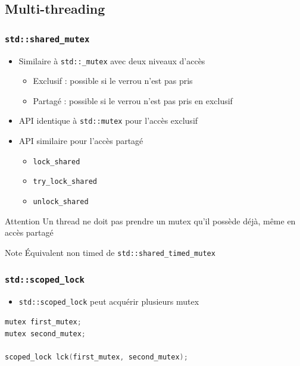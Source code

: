 \documentclass[C++.tex]{subfiles}
\begin{document}
\subsection*{Multi-threading}
\begin{frame}[fragile]
	\frametitle{\lstinline|std::shared_mutex|}
	\begin{itemize}
		\item Similaire à \lstinline|std::_mutex| avec deux niveaux d'accès
		\begin{itemize}
			\item Exclusif : possible si le verrou n'est pas pris
			\item Partagé : possible si le verrou n'est pas pris en exclusif
		\end{itemize}
		\item API identique à \lstinline|std::mutex| pour l'accès exclusif
		\item API similaire pour l'accès partagé
		\begin{itemize}
			\item \lstinline|lock_shared|
			\item \lstinline|try_lock_shared|
			\item \lstinline|unlock_shared|
		\end{itemize}
	\end{itemize}

	\begin{alertblock}{Attention}
		Un thread ne doit pas prendre un mutex qu'il possède déjà, même en accès partagé
	\end{alertblock}

	\begin{block}{Note}
		Équivalent non \og timed\fg{} de \lstinline|std::shared_timed_mutex|
	\end{block}
\end{frame}

\begin{frame}[fragile]
	\frametitle{\lstinline|std::scoped_lock|}
	\begin{itemize}
		\item \lstinline|std::scoped_lock| peut acquérir plusieurs mutex
	\end{itemize}

	\begin{lstlisting}[language=C++]
mutex first_mutex;
mutex second_mutex;

scoped_lock lck(first_mutex, second_mutex);\end{lstlisting}
\end{frame}
\end{document}
